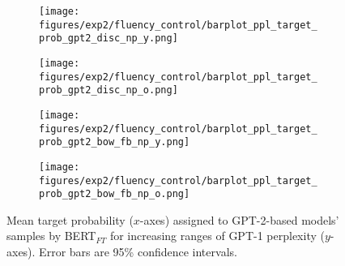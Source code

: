 

\begin{figure}[H]
     \centering
     \begin{subfigure}[b]{0.48\textwidth}
        \centering
        \texttt{[image: figures/exp2/fluency\_control/barplot\_ppl\_target\_prob\_gpt2\_disc\_np\_y.png]}
        \caption{}
        \label{subfig:barplot_ppl_target_prob_np_gpt2_disc_young}
     \end{subfigure}
     \quad
     \begin{subfigure}[b]{0.48\textwidth}
        \centering
        \texttt{[image: figures/exp2/fluency\_control/barplot\_ppl\_target\_prob\_gpt2\_disc\_np\_o.png]}
        \caption{}
        \label{subfig:barplot_ppl_target_prob_np_gpt2_disc_old}
     \end{subfigure}
    \medskip
    \begin{subfigure}[b]{0.48\textwidth}
        \centering
        \texttt{[image: figures/exp2/fluency\_control/barplot\_ppl\_target\_prob\_gpt2\_bow\_fb\_np\_y.png]}
        \caption{}
        \label{subfig:barplot_ppl_target_prob_np_gpt2_bow_young}
     \end{subfigure}
    \quad
     \begin{subfigure}[b]{0.48\textwidth}
        \centering
        \texttt{[image: figures/exp2/fluency\_control/barplot\_ppl\_target\_prob\_gpt2\_bow\_fb\_np\_o.png]}
        \caption{}
        \label{subfig:barplot_ppl_target_prob_np_gpt2_bow_old}
     \end{subfigure}
    \caption{Mean target probability ($x$-axes) assigned to GPT-2-based models' samples by BERT$_{FT}$ for increasing ranges of GPT-1 perplexity ($y$-axes). Error bars are 95\% confidence intervals.}
    \label{fig:barplot_ppl_target_prob_np_gpt2}
\end{figure}

